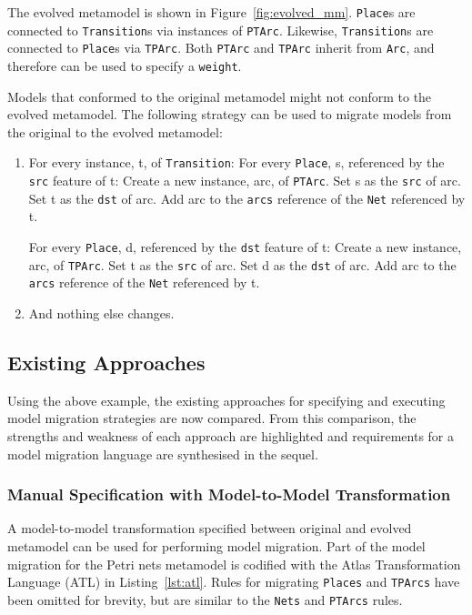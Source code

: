 The evolved metamodel is shown in Figure~\ref{fig:evolved_mm}. \texttt{Place}s are connected to \texttt{Transition}s via instances of \texttt{PTArc}. Likewise, \texttt{Transition}s are connected to \texttt{Place}s via \texttt{TPArc}. Both \texttt{PTArc} and \texttt{TPArc} inherit from \texttt{Arc}, and therefore can be used to specify a \texttt{weight}.

Models that conformed to the original metamodel might not conform to the evolved metamodel. The following strategy can be used to migrate models from the original to the evolved metamodel:

\begin{enumerate}
	\item For every instance, t, of \texttt{Transition}: 
	\subitem For every \texttt{Place}, s, referenced by the \texttt{src} feature of t: 
	\subsubitem Create a new instance, arc, of \texttt{PTArc}. 
	\subsubitem Set s as the \texttt{src} of arc. 
	\subsubitem Set t as the \texttt{dst} of arc. 
	\subsubitem Add arc to the \texttt{arcs} reference of the \texttt{Net} referenced by t.
	
	\subitem For every \texttt{Place}, d, referenced by the \texttt{dst} feature of t: 
	\subsubitem Create a new instance, arc, of \texttt{TPArc}. 
	\subsubitem Set t as the \texttt{src} of arc. 
	\subsubitem Set d as the \texttt{dst} of arc. 
	\subsubitem Add arc to the \texttt{arcs} reference of the \texttt{Net} referenced by t.
	
	\item And nothing else changes.
\end{enumerate}

\subsection{Existing Approaches}
\label{subsec:existing_migration_languages}
Using the above example, the existing approaches for specifying and executing model migration strategies are now compared. From this comparison, the strengths and weakness of each approach are highlighted and requirements for a model migration language are synthesised in the sequel.

\subsubsection{Manual Specification with Model-to-Model Transformation}
\label{subsubsec:m2m}

A model-to-model transformation specified between original and evolved metamodel can be used for performing model migration. Part of the model migration for the Petri nets metamodel is codified with the Atlas Transformation Language (ATL) \cite{jouault05transforming} in Listing~\ref{lst:atl}. Rules for migrating \texttt{Places} and \texttt{TPArcs} have been omitted for brevity, but are similar to the \texttt{Nets} and \texttt{PTArcs} rules.

